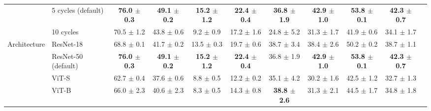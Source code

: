 \begin{table}[t]
\begin{adjustbox}{max width=\textwidth}
\begin{tabular}{l l c c c c c c c c c}
\rowcolor{blue!10}  & 5 cycles (default) & \textbf{76.0 {\scriptsize$\pm$ 0.3}} & \textbf{49.1 {\scriptsize$\pm$ 0.2}} & \textbf{15.2 {\scriptsize$\pm$ 1.2}} & \textbf{22.4 {\scriptsize$\pm$ 0.4}} & \textbf{36.8 {\scriptsize$\pm$ 1.9}} & \textbf{42.9 {\scriptsize$\pm$ 1.0}} & \textbf{53.8 {\scriptsize$\pm$ 0.1}} & \textbf{42.3 {\scriptsize$\pm$ 0.7}} \\
 & 10 cycles & 70.5 {\scriptsize$\pm$ 1.2} & 43.8 {\scriptsize$\pm$ 0.6} & 9.2 {\scriptsize$\pm$ 0.9} & 17.2 {\scriptsize$\pm$ 1.6} & 24.8 {\scriptsize$\pm$ 5.2} & 31.3 {\scriptsize$\pm$ 1.7} & 41.9 {\scriptsize$\pm$ 0.6} & 34.1 {\scriptsize$\pm$ 1.7} \\
\midrule
Architecture & ResNet-18 & 68.8 {\scriptsize$\pm$ 0.1} & 41.7 {\scriptsize$\pm$ 0.2} & 13.5 {\scriptsize$\pm$ 0.3} & 19.7 {\scriptsize$\pm$ 0.6} & 38.7 {\scriptsize$\pm$ 3.4} & 38.4 {\scriptsize$\pm$ 2.6} & 50.2 {\scriptsize$\pm$ 0.2} & 38.7 {\scriptsize$\pm$ 1.1} \\
\rowcolor{blue!10}  & ResNet-50 (default) & \textbf{76.0 {\scriptsize$\pm$ 0.3}} & \textbf{49.1 {\scriptsize$\pm$ 0.2}} & \textbf{15.2 {\scriptsize$\pm$ 1.2}} & \textbf{22.4 {\scriptsize$\pm$ 0.4}} & 36.8 {\scriptsize$\pm$ 1.9} & \textbf{42.9 {\scriptsize$\pm$ 1.0}} & \textbf{53.8 {\scriptsize$\pm$ 0.1}} & \textbf{42.3 {\scriptsize$\pm$ 0.7}} \\
 & ViT-S & 62.7 {\scriptsize$\pm$ 0.4} & 37.6 {\scriptsize$\pm$ 0.6} & 8.8 {\scriptsize$\pm$ 0.5} & 12.2 {\scriptsize$\pm$ 0.2} & 35.1 {\scriptsize$\pm$ 4.2} & 30.2 {\scriptsize$\pm$ 1.6} & 42.5 {\scriptsize$\pm$ 1.2} & 32.7 {\scriptsize$\pm$ 1.3} \\
 & ViT-B & 66.0 {\scriptsize$\pm$ 2.3} & 40.6 {\scriptsize$\pm$ 2.3} & 8.3 {\scriptsize$\pm$ 0.5} & 14.3 {\scriptsize$\pm$ 0.8} & \textbf{38.8 {\scriptsize$\pm$ 2.6}} & 31.3 {\scriptsize$\pm$ 2.1} & 44.5 {\scriptsize$\pm$ 1.7} & 34.8 {\scriptsize$\pm$ 1.8} \\
\bottomrule
\end{tabular}
\end{adjustbox}
\end{table}
